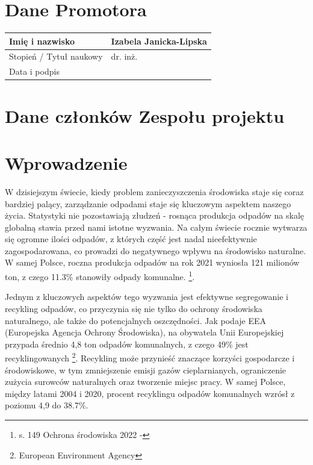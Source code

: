 \documentclass[12pt, a4paper, twoside, openany]{book}
\begin{document}
\section{Dane Promotora}

\begin{tabular}{ |p{5cm}|p{7cm}|}
    \hline
    Imię i nazwisko         & Izabela Janicka-Lipska \\
    \hline
    Stopień / Tytuł naukowy & dr. inż.               \\
    \hline
    Data i podpis           &                        \\ \hline
\end{tabular}

\section{Dane członków Zespołu projektu}

\membersTable


\section{Wprowadzenie}
W dzisiejszym świecie, kiedy problem zanieczyszczenia środowiska staje się coraz bardziej palący, zarządzanie odpadami staje się kluczowym aspektem naszego życia. Statystyki nie pozostawiają złudzeń - rosnąca produkcja odpadów na skalę globalną stawia przed nami istotne wyzwania. Na całym świecie rocznie wytwarza się ogromne ilości odpadów, z których część jest nadal nieefektywnie zagospodarowana, co prowadzi do negatywnego wpływu na środowisko naturalne. W samej Polsce, roczna produkcja odpadów na rok 2021 wyniosła 121 milionów ton, z czego 11.3\% stanowiły odpady komunalne. \footnote{s. 149 Ochrona środowiska 2022 - }.

Jednym z kluczowych aspektów tego wyzwania jest efektywne segregowanie i recykling odpadów, co przyczynia się nie tylko do ochrony środowiska naturalnego, ale także do potencjalnych oszczędności. Jak podaje EEA (Europejska Agencja Ochrony Środowiska), na obywatela Unii Europejskiej przypada średnio 4,8 ton odpadów komunalnych, z czego 49\% jest recyklingowanych \footnote{European Environment Agency}. Recykling może przynieść znaczące korzyści gospodarcze i środowiskowe, w tym zmniejszenie emisji gazów cieplarnianych, ograniczenie zużycia surowców naturalnych oraz tworzenie miejsc pracy. W samej Polsce, między latami 2004 i 2020, procent recyklingu odpadów komunalnych wzrósł z poziomu 4,9 do 38.7\%.
\end{document}
